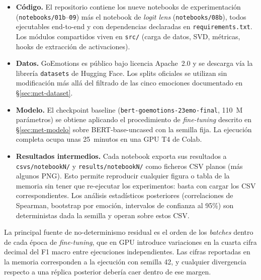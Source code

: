 \begin{itemize}[nosep]
    \item \textbf{Código.} El repositorio contiene los nueve notebooks
    de experimentación (\texttt{notebooks/01b}--\texttt{09}) más el
    notebook de \emph{logit lens} (\texttt{notebooks/08b}), todos ejecutables
    end-to-end y con dependencias declaradas en \texttt{requirements.txt}.
    Los módulos compartidos viven en \texttt{src/} (carga de datos,
    SVD, métricas, hooks de extracción de activaciones).

    \item \textbf{Datos.} GoEmotions \cite{demszky2020goemotions} es
    público bajo licencia Apache~2.0 y se descarga vía la librería
    \texttt{datasets} de Hugging Face. Los splits oficiales se utilizan
    sin modificación más allá del filtrado de las cinco emociones
    documentado en \S\ref{sec:met-dataset}.

    \item \textbf{Modelo.} El checkpoint baseline
    (\texttt{bert-goemotions-23emo-final}, 110~M parámetros) se obtiene
    aplicando el procedimiento de \emph{fine-tuning} descrito en
    \S\ref{sec:met-modelo} sobre BERT-base-uncased
    \cite{devlin2019bert} con la semilla fija. La ejecución completa
    ocupa unas 25~minutos en una GPU T4 de Colab.

    \item \textbf{Resultados intermedios.} Cada notebook exporta sus
    resultados a \texttt{csvs/notebookN/} y \texttt{results/notebookN/}
    como ficheros CSV planos (más algunos PNG). Esto permite reproducir
    cualquier figura o tabla de la memoria sin tener que re-ejecutar
    los experimentos: basta con cargar los CSV correspondientes. Los
    análisis estadísticos posteriores (correlaciones de Spearman,
    bootstrap por emoción, intervalos de confianza al 95\%) son
    deterministas dada la semilla y operan sobre estos CSV.
\end{itemize}

La principal fuente de no-determinismo residual es el orden de los
\textit{batches} dentro de cada época de \emph{fine-tuning}, que en GPU
introduce variaciones en la cuarta cifra decimal del F1 macro entre
ejecuciones independientes. Las cifras reportadas en la memoria
corresponden a la ejecución con semilla 42, y cualquier divergencia
respecto a una réplica posterior debería caer dentro de ese margen.